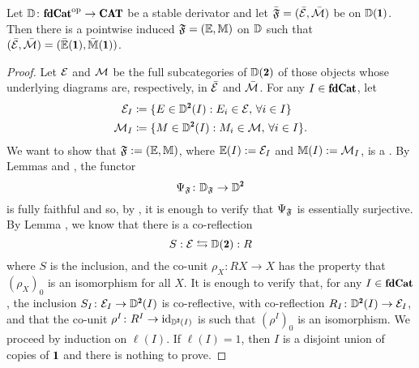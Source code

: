 \begin{theorem}\label{everything_is_maximal}
Let $\D\colon \fincat^\opp\to \Cat$ be a stable derivator and let $\bar{\mathfrak{F}}=(\bar{\mathcal{E}},\bar{\mathcal{M}})$ be {\hfs} on $\D(\uno)$. Then there is a pointwise induced \dfs $\mathfrak{F}=(\mathbb E,\mathbb M)$ on $\mathbb{D}$ such that $(\bar\E,\bar\M)=(\bar{\mathbb E}(\uno),\bar{\mathbb M}(\uno))$.
\end{theorem}
\begin{proof}
Let $\mathcal{E}$ and $\mathcal{M}$ be the full subcategories of $\D(\due)$ of those objects whose underlying diagrams are, respectively, in $\bar {\mathcal{E}}$ and $\bar {\mathcal{M}}$. For any $I\in \fincat$, let
\begin{align*}
\E_I & \coloneqq \{E\in\D^\due(I):E_i\in\E,\, \forall i\in I\}\\ 
\M_I & \coloneqq \{M\in\D^\due(I):M_i\in\M,\, \forall i\in I\}.
\end{align*}
We want to show that $\mathfrak{F}:=(\mathbb E,\mathbb M)$, where $\mathbb E(I):=\mathcal{E}_I$ and $\mathbb M(I):=\mathcal{M}_I$, is a {\dfs}.
By Lemmas  and , the functor
\[
\Psi_\F\colon \D_\F\to \D^\due
\] 
is fully faithful and so, by \athm {}, it is enough to verify that $\Psi_{\mathfrak{F}}$ is essentially surjective. By Lemma , we know that there is a co-reflection
\[
S: \E\leftrightarrows \D(\due): R
\]
where $S$ is the inclusion, and the co-unit $\rho_X\colon RX\to X$ has the property that $(\rho_X)_0$ is an isomorphism for all $X$.  It is enough to verify that, for any $I\in \fincat$, the inclusion $S_I\colon \E_I\to \D^\due(I)$ is co-reflective, with co-reflection $R_I\colon \D^\due(I)\to \E_I$, and that the co-unit $\rho^I\colon R^I\to \id_{\D^\due(I)}$ is such that $(\rho^I)_0$ is an isomorphism. 
We proceed by induction on $\ell(I)$. If $\ell(I)=1$, then $I$ is a disjoint union of copies of $ \uno$ and there is nothing to prove.%


\end{proof}
